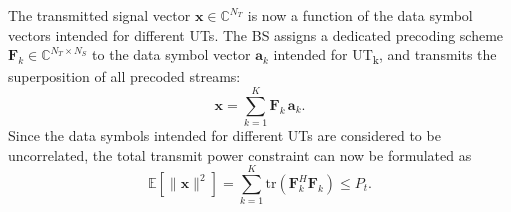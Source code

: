 The transmitted signal vector $\mathbf{x} \in \mathbb{C}^{N_T}$ is now a function of the data symbol vectors intended for different \acp{UT}. The \ac{BS} assigns a dedicated precoding scheme $\mathbf{F}_k \in \mathbb{C}^{N_T \times N_S}$ to the data symbol vector $\mathbf{a}_k$ intended for \ac{UT}\textsubscript{k}, and transmits the superposition of all precoded streams:
\begin{equation}
    \mathbf{x} = \sum_{k=1}^{K} \mathbf{F}_k \, \mathbf{a}_k.
\label{eq:mu_mimo_precoding}
\end{equation}
Since the data symbols intended for different \acp{UT} are considered to be uncorrelated, the total transmit power constraint can now be formulated as
\begin{equation}
    \mathbb{E}\!\left[\|\mathbf{x}\|^2\right] = \sum_{k=1}^{K} \mathrm{tr}\!\left(\mathbf{F}_k^H \mathbf{F}_k\right) \leq P_t.
\end{equation}


